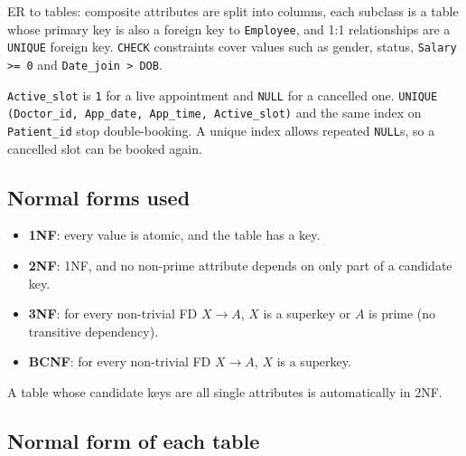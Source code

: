 \documentclass[11pt,a4paper]{article}
\newcommand{\code}[1]{\texttt{#1}}
\begin{document}
ER to tables: composite attributes are split into columns, each subclass is a table whose primary key is also a foreign key to \code{Employee}, and 1:1 relationships are a \code{UNIQUE} foreign key. \code{CHECK} constraints cover values such as gender, status, \code{Salary >= 0} and \code{Date\_join > DOB}.

\code{Active\_slot} is \code{1} for a live appointment and \code{NULL} for a cancelled one. \code{UNIQUE (Doctor\_id, App\_date, App\_time, Active\_slot)} and the same index on \code{Patient\_id} stop double-booking. A unique index allows repeated \code{NULL}s, so a cancelled slot can be booked again.

\subsection{Normal forms used}

\begin{itemize}
  \item \textbf{1NF}: every value is atomic, and the table has a key.
  \item \textbf{2NF}: 1NF, and no non-prime attribute depends on only part of a candidate key.
  \item \textbf{3NF}: for every non-trivial FD $X \rightarrow A$, $X$ is a superkey or $A$ is prime (no transitive dependency).
  \item \textbf{BCNF}: for every non-trivial FD $X \rightarrow A$, $X$ is a superkey.
\end{itemize}

A table whose candidate keys are all single attributes is automatically in 2NF.

\subsection{Normal form of each table}
\end{document}

